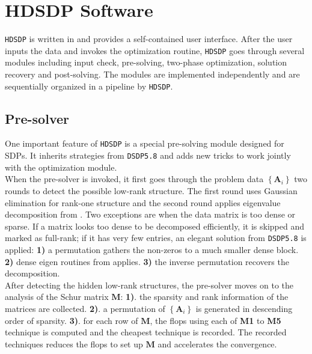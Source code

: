 \documentclass[10pt]{article}
\begin{document}
{\section{HDSDP Software}\label{sec5}

{{\texttt{HDSDP}}} is written in  and provides a
self-contained user interface. After the user inputs the data and invokes the
optimization routine, {{\texttt{HDSDP}}} goes through several modules
including input check, pre-solving, two-phase optimization, solution recovery
and post-solving. The modules are implemented independently and are
sequentially organized in a pipeline by {{\texttt{HDSDP}}}.

\subsection{Pre-solver}

One important feature of {{\texttt{HDSDP}}} is a special pre-solving module
 designed for SDPs. It inherits strategies from
{{\texttt{DSDP5.8}}} and adds new tricks to work jointly with the
optimization module.\\

When the pre-solver is invoked, it first goes through the problem data
$\left\{ \mathbf{A}_i \right\}$ two rounds to detect the possible low-rank structure.
The first round uses Gaussian elimination for rank-one structure and the
second round applies eigenvalue decomposition from . Two
exceptions are when the data matrix is too dense or sparse. If a matrix looks
too dense to be decomposed efficiently, it is skipped and marked as full-rank;
if it has very few entries, an elegant solution from {{\texttt{DSDP5.8}}} is
applied: {\textbf{1)}} a permutation gathers the non-zeros to a much smaller
dense block. {\textbf{2)}} dense eigen routines from 
applies. {\textbf{3)}} the inverse permutation recovers the decomposition.\\

After detecting the hidden low-rank structures, the pre-solver moves on to
the analysis of the Schur matrix $\mathbf{M}$: {\textbf{1)}}. the sparsity and rank
information of the matrices are collected. {\textbf{2)}}. a permutation of
$\left\{ \mathbf{A}_i \right\}$ is generated in descending order of sparsity.
{\textbf{3)}}. for each row of $\mathbf{M}$, the flops using each of {\textbf{M1}}
to {\textbf{M5}} technique is computed and the cheapest technique is
recorded. The recorded techniques reduces the flops to set up $\mathbf{M}$ and
accelerates the convergence.\\

}
\end{document}
